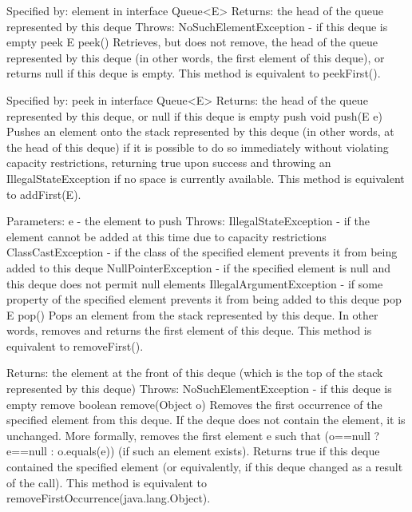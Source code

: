 \documentclass{book}
\begin{document}
Specified by:
element in interface Queue<E>
Returns:
the head of the queue represented by this deque
Throws:
NoSuchElementException - if this deque is empty
peek
E peek()
Retrieves, but does not remove, the head of the queue represented by this deque (in other words, the first element of this deque), or returns null if this deque is empty.
This method is equivalent to peekFirst().

Specified by:
peek in interface Queue<E>
Returns:
the head of the queue represented by this deque, or null if this deque is empty
push
void push(E e)
Pushes an element onto the stack represented by this deque (in other words, at the head of this deque) if it is possible to do so immediately without violating capacity restrictions, returning true upon success and throwing an IllegalStateException if no space is currently available.
This method is equivalent to addFirst(E).

Parameters:
e - the element to push
Throws:
IllegalStateException - if the element cannot be added at this time due to capacity restrictions
ClassCastException - if the class of the specified element prevents it from being added to this deque
NullPointerException - if the specified element is null and this deque does not permit null elements
IllegalArgumentException - if some property of the specified element prevents it from being added to this deque
pop
E pop()
Pops an element from the stack represented by this deque. In other words, removes and returns the first element of this deque.
This method is equivalent to removeFirst().

Returns:
the element at the front of this deque (which is the top of the stack represented by this deque)
Throws:
NoSuchElementException - if this deque is empty
remove
boolean remove(Object o)
Removes the first occurrence of the specified element from this deque. If the deque does not contain the element, it is unchanged. More formally, removes the first element e such that (o==null ? e==null : o.equals(e)) (if such an element exists). Returns true if this deque contained the specified element (or equivalently, if this deque changed as a result of the call).
This method is equivalent to removeFirstOccurrence(java.lang.Object).
\end{document}
